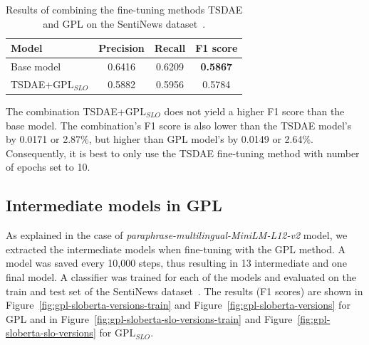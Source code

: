 \documentclass[fleqn,moreauthors,10pt]{ds_report}
\begin{document}
\begin{table}[!h]
	\footnotesize
	\begin{center}
		\begin{tabular}{ |l|c|c|c| }
		\hline
		\rowcolor{Blue}Model & Precision & Recall & F1 score\\
		\hline

		Base model & 0.6416 & 0.6209 & \textbf{0.5867}\\
		TSDAE+$\text{GPL}_{SLO}$ & 0.5882 & 0.5956 & 0.5784\\

		\hline
		\end{tabular}
	\end{center}
\caption{Results of combining the fine-tuning methods TSDAE and GPL on the SentiNews dataset~\cite{sentiNews}.}
\label{tab5}
\end{table}

The combination TSDAE+$\text{GPL}_{SLO}$ does not yield a higher F1 score than the base model. The combination's F1 score is also lower than the TSDAE model's by 0.0171 or 2.87\%, but higher than GPL model's by 0.0149 or 2.64\%. Consequently, it is best to only use the TSDAE fine-tuning method with number of epochs set to 10.


\subsection*{Intermediate models in GPL}
As explained in the case of {\it paraphrase-multilingual-MiniLM-L12-v2} model, we extracted the intermediate models when fine-tuning with the GPL method. A model was saved every 10,000 steps, thus resulting in 13 intermediate and one final model. A classifier was trained for each of the models and evaluated on the train and test set of the SentiNews dataset~\cite{sentiNews}. The results (F1 scores) are shown in Figure~\ref{fig:gpl-sloberta-versions-train} and Figure~\ref{fig:gpl-sloberta-versions} for GPL and in Figure~\ref{fig:gpl-sloberta-slo-versions-train} and Figure~\ref{fig:gpl-sloberta-slo-versions} for $\text{GPL}_{SLO}$.
\end{document}
